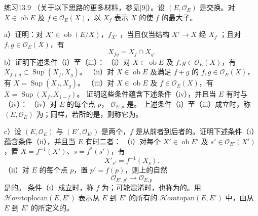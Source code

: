 \begin{SGAresult}{练习}{13.9}
（关于以下思路的更多材料，参见[9]）。设 $(E,\mathcal O_E)$ 是交换。对 $X\in\operatorname{ob}E$ 及 $f\in\mathcal O_E(X)$，以 $X_f$ 表示 $X$ 的使 $f$ 的最大子。

a）证明：对 $X'\in\operatorname{ob}(E/X)$，$f_{X'}$ ，当且仅当结构 $X'\to X$ 经 $X_f$ ；且对 $f,g\in\mathcal O_E(X)$，有
\[X_{fg}=X_f\cap X_g.\]
b）证明下述条件（i）至（iii）：
（i）对 $X\in\operatorname{ob}E$ 及 $f,g\in\mathcal O_E(X)$，有 $X_{f+g}\subset\operatorname{Sup}(X_f,X_g)$。
（ii）对 $X\in\operatorname{ob}E$ 及满足 $f+g$ 的 $f,g\in\mathcal O_E(X)$，有 $X=\operatorname{Sup}(X_f,X_g)$。
（iii）对 $X\in\operatorname{ob}E$ 及 $f\in\mathcal O_E(X)$，有 $X=\operatorname{Sup}(X_f,X_{1-f})$。
证明这些条件蕴含下述条件（iv），并且当 $E$ 有时与（iv）：
（iv）对 $E$ 的每个点 $p$， $\mathcal O_{E,p}$ 是。
上述条件（i）至（iii）成立时，称 $(E,\mathcal O_E)$ 为；同样，若所的是，则称它为。

c）设 $(E,\mathcal O_E)$ 与 $(E',\mathcal O_{E'})$ 是两个，$f$ 是从前者到后者的。证明下述条件（i）蕴含条件（ii），并且当 $E$ 有时二者：
（i）对每个 $X'\in\operatorname{ob}E'$ 及 $s'\in\mathcal O_{E'}(X')$，置 $X=f^{-1}(X')$、$s=f^*(s')$，有
\[X'_{s'}=f^{-1}(X_s).\]
（ii）对 $E$ 的每个点 $p$，置 $p'=f(p)$，则上的自然
\[\mathcal O_{E',p'}\longrightarrow\mathcal O_{E,p}\]
是的。
条件（i）成立时，称 $f$ 为；可能混淆时，也称为的。用 $\mathscr{H}\!om\mathrm{toplocan}(E,E')$ 表示从 $E$ 到 $E'$ 的所有的 $\mathscr{H}\!om\mathrm{topan}(E,E')$ 中，由从 $E$ 到 $E'$ 的所定义的。


\end{SGAresult}
